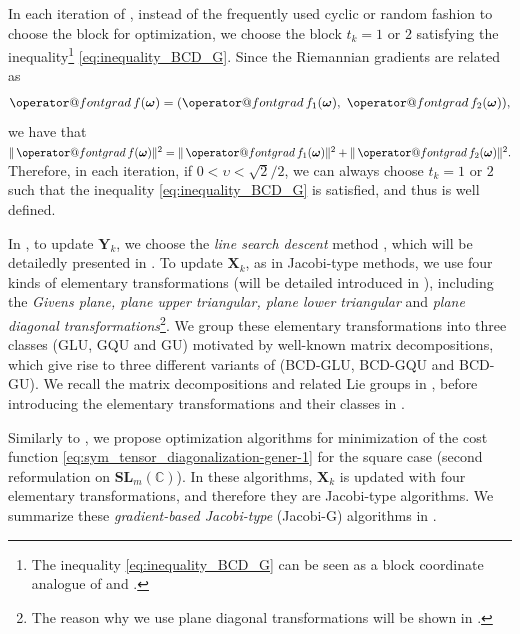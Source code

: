 \documentclass[final,onefignum,onetabnum]{siamart190516}
\makeatletter
\newcommand{\matr}[1]{\boldsymbol{#1}}
\newcommand{\ProjGrad}[2]{\mathop{{\operator@font grad} }#1(#2)}
\newcommand{\CC}{\mathbb{C}}
\newcommand{\SL}{\mathbf{SL}}
\makeatother
\begin{document}
In each iteration of , instead of the frequently used cyclic or random fashion to choose the block for optimization, we choose the block $t_k=1$ or $2$ satisfying the inequality\footnote{The inequality \cref{eq:inequality_BCD_G} can be seen as a block coordinate analogue of \cite[Eq. (3.3)]{IshtAV13:simax} and \cite[Eq. (10)]{LUC2017globally}.} \cref{eq:inequality_BCD_G}. 
Since the Riemannian gradients are related as 
\begin{align}\label{eq:grad_relation}
\ProjGrad{f}{\matr{\omega}} = (\ProjGrad{f_1}{\matr{\omega}},\ \ProjGrad{f_2}{\matr{\omega}}),
\end{align}
we have that 
$\|\ProjGrad{f}{\matr{\omega}}\|^2=\|\ProjGrad{f_1}{\matr{\omega}}\|^2+\|\ProjGrad{f_2}{\matr{\omega}}\|^2.$ 
Therefore, in each iteration, if $0<\upsilon<\sqrt{2}/2$, we can always choose $t_k=1$ or $2$ such that the inequality \cref{eq:inequality_BCD_G} is satisfied, and thus  is well defined. 


In , to update $\matr{Y}_k$, we choose the \emph{line search descent} method \cite{absil2005convergence,absil2009optimization,nocedal2006numerical,ring2012optimization,sato2015new}, which will be detailedly presented in . 
To update $\matr{X}_k$, as in Jacobi-type methods, we use four kinds of elementary transformations (will be detailed introduced in ), including the \emph{Givens plane, plane upper triangular, plane lower triangular} and \emph{plane diagonal transformations}\footnote{The reason why we use plane diagonal transformations will be shown in .}. 
We group these elementary transformations into three classes (GLU, GQU and GU)  motivated by well-known matrix decompositions,
which give rise to three different variants of   (BCD-GLU, BCD-GQU and BCD-GU).
We recall the matrix decompositions and related Lie groups in ,
before introducing the elementary transformations and their classes in .

Similarly to , we propose optimization algorithms for minimization of the cost function \cref{eq:sym_tensor_diagonalization-gener-1} for the square case (second reformulation on $\SL_{m}(\CC)$).
In these algorithms, $\matr{X}_k$ is updated with  four elementary transformations, and therefore they are Jacobi-type algorithms.
We summarize these \emph{gradient-based Jacobi-type} (Jacobi-G) algorithms in .
\end{document}
